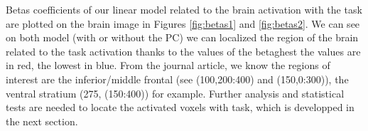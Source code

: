 \noindent
\par Betas coefficients of our linear model related to the brain activation with the task 
are plotted on the brain image in Figures \ref{fig:betas1} and \ref{fig:betas2}. We can see on both model 
(with or without the PC) we can localized the region of the brain related to the task 
activation thanks to the values of the betaghest the values are in red, the lowest in blue. 
From the journal article, we know the regions of interest are the inferior/middle frontal 
(see (100,200:400) and (150,0:300)), the ventral stratium (275, (150:400)) for example. 
Further analysis and statistical tests are needed to locate the activated voxels with task,
which is developped in the next section.


